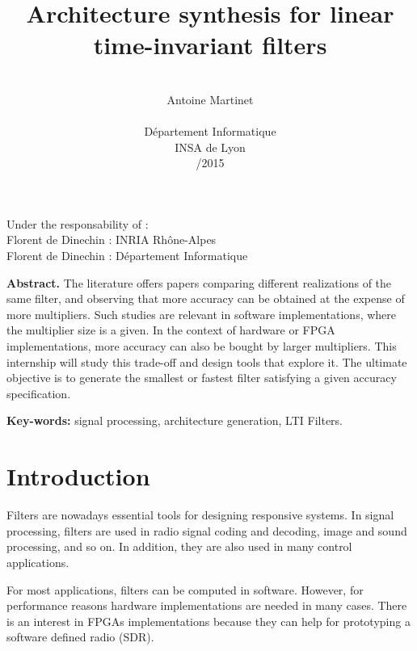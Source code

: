 \documentclass[twoside]{article}
\title{\vspace{-40pt}
	\fontsize{14}{16.8}\selectfont
	\textbf{Architecture synthesis for linear time-invariant filters}}
\author{\\ \fontsize{10}{12}\selectfont Antoine Martinet \\\\ \fontsize{9}{10.8}\selectfont Département Informatique \\ \fontsize{9}{10.8}\selectfont INSA de Lyon \\ \fontsize{9}{10.8}\selectfont 2014/2015}
\date{}
\theoremstyle{remark}
\numberwithin{equation}{subsection}
\newcommand{\TODO}{\textbf{TODO}}
\begin{document}
\maketitle
\noindent Under the responsability of : \\
Florent de Dinechin : INRIA Rhône-Alpes \\
Florent de Dinechin : Département Informatique
\vspace{20pt}

\begingroup

	\fontsize{9}{10.8}\selectfont
	\rightskip\leftskip
	\noindent \textbf{Abstract.}
	The literature offers papers comparing different realizations of the same filter,
	and observing that more accuracy can be obtained at the expense of more multipliers.
	Such studies are relevant in software implementations, where the multiplier size is a given.
	In the context of hardware or FPGA implementations, more accuracy can also be bought by larger multipliers.
	This internship will study this trade-off and design tools that explore it.
	The ultimate objective is to generate the smallest or fastest filter satisfying a given accuracy specification.

	\vspace{20pt}

\endgroup
	
	\noindent \textbf{Key-words:}
	signal processing,
	architecture generation,
	LTI Filters.


\section{ Introduction }

	Filters are nowadays essential tools for designing responsive systems.
	In signal processing, filters are used in
	radio signal coding and decoding, image and sound processing, and so on.
	In addition, they are also used in many control applications.



	For most applications, filters can be computed in software.
	However, for performance reasons hardware implementations are needed in many cases.
	There is an interest in FPGAs implementations because they can help for prototyping a software defined radio (SDR).
\end{document}
